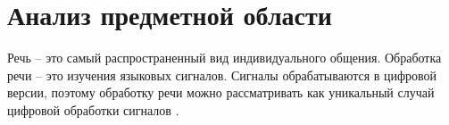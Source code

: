 \chapter{Анализ предметной области}

Речь -- это самый распространенный вид индивидуального общения. Обработка речи -- это изучения языковых сигналов. Сигналы обрабатываются в цифровой версии, поэтому обработку речи можно рассматривать как уникальный случай цифровой обработки сигналов \cite{vvegenie}.